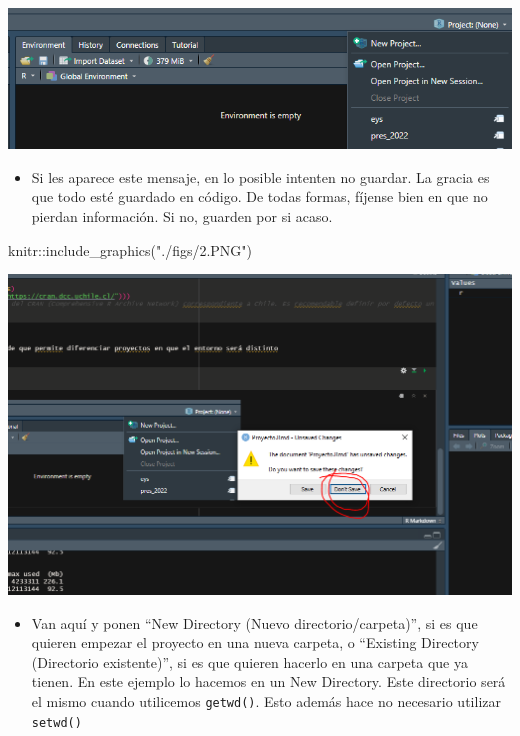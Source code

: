 \documentclass[
]{article}
\newenvironment{Shaded}{}{}
\newcommand{\FunctionTok}[1]{\textcolor[rgb]{0.02,0.16,0.49}{#1}}
\newcommand{\NormalTok}[1]{#1}
\newcommand{\SpecialCharTok}[1]{\textcolor[rgb]{0.25,0.44,0.63}{#1}}
\newcommand{\StringTok}[1]{\textcolor[rgb]{0.25,0.44,0.63}{#1}}
\providecommand{\tightlist}{%
  \setlength{\itemsep}{0pt}\setlength{\parskip}{0pt}}
\begin{document}
\begin{center}\includegraphics[width=0.6\linewidth]{./figs/1} \end{center}

\begin{itemize}
\tightlist
\item
  Si les aparece este mensaje, en lo posible intenten no guardar. La
  gracia es que todo esté guardado en código. De todas formas, fíjense
  bien en que no pierdan información. Si no, guarden por si acaso.
\end{itemize}

\begin{Shaded}
\begin{Highlighting}[]
\NormalTok{knitr}\SpecialCharTok{::}\FunctionTok{include\_graphics}\NormalTok{(}\StringTok{"./figs/2.PNG"}\NormalTok{)}
\end{Highlighting}
\end{Shaded}

\begin{center}\includegraphics[width=0.6\linewidth]{./figs/2} \end{center}

\begin{itemize}
\tightlist
\item
  Van aquí y ponen ``New Directory (Nuevo directorio/carpeta)'', si es
  que quieren empezar el proyecto en una nueva carpeta, o ``Existing
  Directory (Directorio existente)'', si es que quieren hacerlo en una
  carpeta que ya tienen. En este ejemplo lo hacemos en un New Directory.
  Este directorio será el mismo cuando utilicemos \texttt{getwd()}. Esto
  además hace no necesario utilizar \texttt{setwd()}
\end{itemize}
\end{document}
